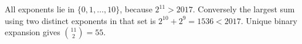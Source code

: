 All exponents lie in $\{0,1,\ldots,10\}$, because $ 2^{11}>2017 $. Conversely the largest sum using two distinct exponents in that set is $ 2^{10}+2^9=1536<2017 $. Unique binary expansion gives $\binom{11}{2}=\boxed{55}$.

